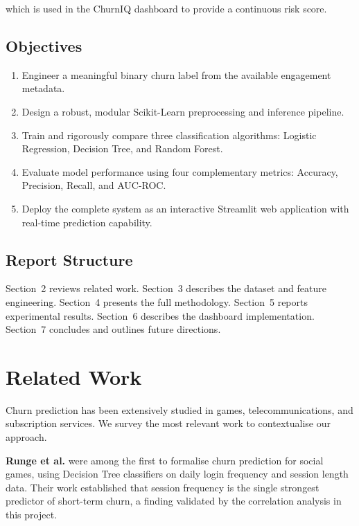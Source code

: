 \documentclass[12pt, a4paper]{article}
\begin{document}
which is used in the ChurnIQ dashboard to provide a continuous risk score.

\subsection{Objectives}

\begin{enumerate}[leftmargin=*, label=\textbf{O\arabic*.}]
    \item Engineer a meaningful binary churn label from the available engagement metadata.
    \item Design a robust, modular Scikit-Learn preprocessing and inference pipeline.
    \item Train and rigorously compare three classification algorithms: Logistic Regression, Decision Tree, and Random Forest.
    \item Evaluate model performance using four complementary metrics: Accuracy, Precision, Recall, and AUC-ROC.
    \item Deploy the complete system as an interactive Streamlit web application with real-time prediction capability.
\end{enumerate}

\subsection{Report Structure}

Section~2 reviews related work. Section~3 describes the dataset and feature
engineering. Section~4 presents the full methodology. Section~5 reports
experimental results. Section~6 describes the dashboard implementation.
Section~7 concludes and outlines future directions.

\section{Related Work}

Churn prediction has been extensively studied in games, telecommunications,
and subscription services. We survey the most relevant work to contextualise
our approach.

\textbf{Runge et al.} \cite{runge2014} were among the first to formalise
churn prediction for social games, using Decision Tree classifiers on daily
login frequency and session length data. Their work established that
session frequency is the single strongest predictor of short-term churn,
a finding validated by the correlation analysis in this project.
\end{document}
